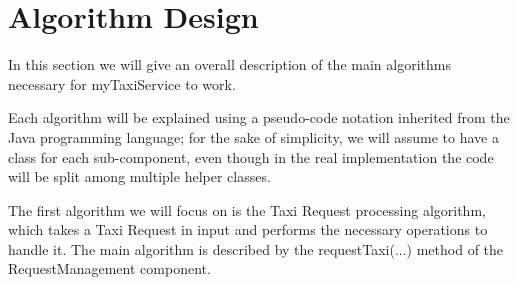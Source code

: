 \chapter{Algorithm Design}
In this section we will give an overall description of the main algorithms necessary for myTaxiService to work. 

Each algorithm will be explained using a pseudo-code notation inherited from the Java programming language; for the sake of simplicity, we will assume to have a class for each sub-component, even though in the real implementation the code will be split among multiple helper classes.

The first algorithm we will focus on is the Taxi Request processing algorithm, which takes a Taxi Request in input and performs the necessary operations to handle it. The main algorithm is described by the requestTaxi(...) method of the RequestManagement component.

